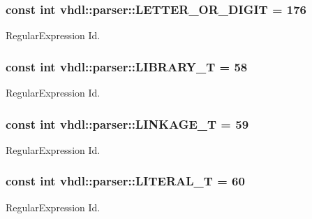 \subsubsection[{L\+E\+T\+T\+E\+R\+\_\+\+O\+R\+\_\+\+D\+I\+G\+I\+T}]{\setlength{\rightskip}{0pt plus 5cm}const int vhdl\+::parser\+::\+L\+E\+T\+T\+E\+R\+\_\+\+O\+R\+\_\+\+D\+I\+G\+I\+T = 176}\label{namespacevhdl_1_1parser_aa6d8261aabc47ffdb6e4de51afb99dde}
Regular\+Expression Id. \hypertarget{namespacevhdl_1_1parser_a6bef91383cde697d409d786fc243ac3c}{}
\subsubsection[{L\+I\+B\+R\+A\+R\+Y\+\_\+\+T}]{\setlength{\rightskip}{0pt plus 5cm}const int vhdl\+::parser\+::\+L\+I\+B\+R\+A\+R\+Y\+\_\+\+T = 58}\label{namespacevhdl_1_1parser_a6bef91383cde697d409d786fc243ac3c}
Regular\+Expression Id. \hypertarget{namespacevhdl_1_1parser_a4f3af3a722365611057cd2fae4f52f91}{}
\subsubsection[{L\+I\+N\+K\+A\+G\+E\+\_\+\+T}]{\setlength{\rightskip}{0pt plus 5cm}const int vhdl\+::parser\+::\+L\+I\+N\+K\+A\+G\+E\+\_\+\+T = 59}\label{namespacevhdl_1_1parser_a4f3af3a722365611057cd2fae4f52f91}
Regular\+Expression Id. \hypertarget{namespacevhdl_1_1parser_a7444eb687b16f815a6a5f22b57ce49a6}{}
\subsubsection[{L\+I\+T\+E\+R\+A\+L\+\_\+\+T}]{\setlength{\rightskip}{0pt plus 5cm}const int vhdl\+::parser\+::\+L\+I\+T\+E\+R\+A\+L\+\_\+\+T = 60}\label{namespacevhdl_1_1parser_a7444eb687b16f815a6a5f22b57ce49a6}
Regular\+Expression Id. \hypertarget{namespacevhdl_1_1parser_aa3842495592970f3c62fb7e7c2af11e4}{}
